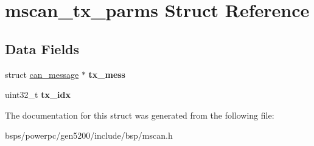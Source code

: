 \hypertarget{structmscan__tx__parms}{}\section{mscan\+\_\+tx\+\_\+parms Struct Reference}
\label{structmscan__tx__parms}
\subsection*{Data Fields}
\begin{DoxyCompactItemize}
\item 
\mbox{\label{structmscan__tx__parms_a8471792dc06c518a5a0b06f5e74808bc}} 
struct \mbox{\hyperlink{unioncan__message}{can\+\_\+message}} $\ast$ {\bfseries tx\+\_\+mess}
\item 
\mbox{\label{structmscan__tx__parms_ac50bab076d54145b233a145e338627ac}} 
uint32\+\_\+t {\bfseries tx\+\_\+idx}
\end{DoxyCompactItemize}


The documentation for this struct was generated from the following file\+:\begin{DoxyCompactItemize}
\item 
bsps/powerpc/gen5200/include/bsp/mscan.\+h\end{DoxyCompactItemize}
